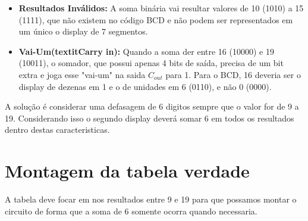 \documentclass[11pt]{report}         %
\begin{document}
\begin {itemize}

\item \textbf{Resultados Inválidos:} A soma binária vai resultar valores de 10 (1010) a 15 (1111), que não existem no código BCD e não podem 
ser representados em um único o display de 7 segmentos.

\item \textbf{Vai-Um(textit{Carry in}):} Quando a soma der entre 16 (10000) e 19 (10011), o somador, que possui apenas 4 bits de saída, precisa de um bit extra 
e joga esse "vai-um" na saida $C_{out}$ para 1. Para o BCD, 16 deveria ser o display de dezenas em 1 e o de unidades em 6 (0110), e não 0 (0000).

\end {itemize}

A solução é considerar uma defasagem de 6 digitos sempre que o valor for de 9 a 19. Considerando isso o segundo display deverá somar 6 em todos os resultados 
dentro destas caracteristicas.

\section {Montagem da tabela verdade}

A tabela deve focar em nos resultados entre 9 e 19 para que possamos montar o circuito de forma que a soma de 6 somente ocorra quando necessaria.
\end{document}
